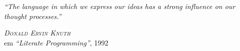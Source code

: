
\begin{epigrafe} %

\hypertarget{estilo:epigrafe}{} %
 
\textit{\large``The language in which we express our ideas has a strong influence on our thought processes.''}

\vspace{1cm}

\hspace{4cm} \emph{\textsc{Donald Ervin Knuth}}\\\hspace{4cm} em \textsl{``Literate Programming''}, 1992

%
%

\end{epigrafe}